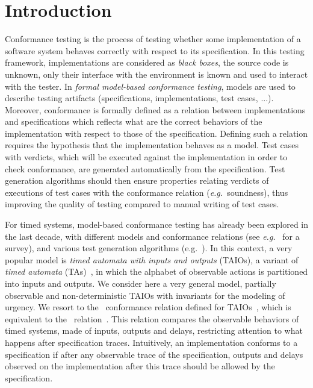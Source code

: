 \documentclass{LMCS}
\theoremstyle{plain}\newtheorem{proposition}[thm]{Proposition}
\def\eg{{\em e.g.}}
\begin{document}
\maketitle

\section*{Introduction}
\label{sec-intro}




Conformance testing is the process of testing whether some
implementation of a software system 
behaves correctly with respect to its specification.
In this testing framework, 
implementations are considered as {\em black boxes}, \ie the source
code is unknown, only their interface with the environment is known
and used to interact with the tester.  In {\em formal model-based conformance testing},
models are used to  describe  testing artifacts
(specifications, implementations, test cases, ...). 
Moreover, conformance is formally defined as a relation 
between implementations and specifications 
which reflects what are the correct behaviors of the implementation
with respect to those of the specification.
Defining such a relation requires the hypothesis that the implementation
behaves as a model.
Test cases with verdicts, which will be executed against the implementation
in order to check conformance, are generated automatically from the 
specification. 
Test generation algorithms should then ensure
properties relating verdicts of executions of test cases 
with the conformance relation (\eg~soundness),
thus improving the quality of testing compared to manual writing of test cases.

For timed systems, model-based conformance testing has already been
explored in the last decade, with different models and conformance
relations (see \eg~\cite{DBLP:conf/formats/SchmaltzT08} for a
survey), and various test generation
algorithms (e.g.~\cite{BrionesBrinksma-FATES05,KrichenTripakis09,NielsenSkou-STTT03}).
In this context, a very popular model is {\em timed automata with
  inputs and outputs} (TAIOs), a variant of {\em timed automata}
(TAs)~\cite{AlurDill94}, in which the alphabet of observable actions is
partitioned into inputs and outputs.  
We consider here a very general model,
partially observable and non-deterministic TAIOs with
invariants for the modeling of urgency.
We resort to the \tioco\, conformance relation defined for TAIOs~\cite{Krichen-Tripakis-2004}, which is equivalent to the \rtioco\, relation~\cite{Larsen-Mikucionis-Nielsen-2004}.
This relation compares the observable behaviors of timed systems,
made of inputs, outputs and delays, restricting attention to what happens 
after specification traces.
Intuitively, an implementation conforms to a specification if after 
any observable trace of the specification,
outputs and delays observed on the implementation after this trace should 
be allowed  by the specification.
\end{document}
